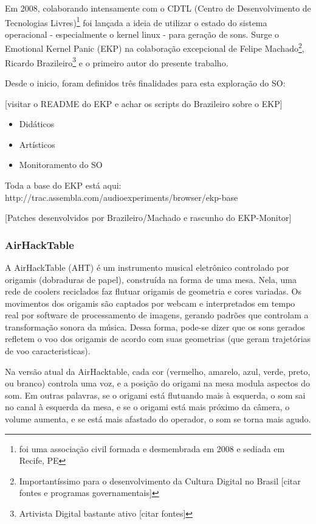 Em 2008, colaborando intensamente com o CDTL (Centro de
Desenvolvimento de Tecnologias Livres)\footnote{foi uma associação
  civil formada e desmembrada em 2008 e sediada em Recife, PE} foi
lançada a ideia de utilizar o estado do sistema operacional -
especialmente o kernel linux - para geração de sons. Surge o Emotional
Kernel Panic (EKP) na colaboração excepcional de Felipe
Machado\footnote{Importantíssimo para o desenvolvimento da Cultura
  Digital no Brasil [citar fontes e programas governamentais]},
Ricardo Brazileiro\footnote{Artivista Digital bastante ativo [citar
    fontes]} e o primeiro autor do presente trabalho.

Desde o inicio, foram definidos três finalidades para esta exploração
do SO:

[visitar o README do EKP e achar os scripts do Brazileiro sobre o EKP]

\begin{itemize}
\item Didáticos
\item Artísticos
\item Monitoramento do SO
\end{itemize}

Toda a base do EKP está aqui: http://trac.assembla.com/audioexperiments/browser/ekp-base

[Patches desenvolvidos por Brazileiro/Machado e rascunho do EKP-Monitor]

\subsubsection{AirHackTable}

A AirHackTable (AHT) é um instrumento musical eletrônico controlado por
origamis (dobraduras de papel), construída na forma de uma mesa. Nela,
uma rede de coolers reciclados faz flutuar origamis de geometria e
cores variadas. Os movimentos dos origamis são captados por webcam e
interpretados em tempo real por software de processamento de imagens,
gerando padrões que controlam a transformação sonora da música. Dessa
forma, pode-se dizer que os sons gerados refletem o voo dos origamis
de acordo com suas geometrias (que geram trajetórias de voo
caracteristicas).

Na versão atual da AirHacktable, cada cor (vermelho, amarelo, azul,
verde, preto, ou branco) controla uma voz, e a posição do origami na
mesa modula aspectos do som. Em outras palavras, se o origami está
flutuando mais à esquerda, o som sai no canal à esquerda da mesa, e se
o origami está mais próximo da câmera, o volume aumenta, e se está
mais afastado do operador, o som se torna mais agudo.

